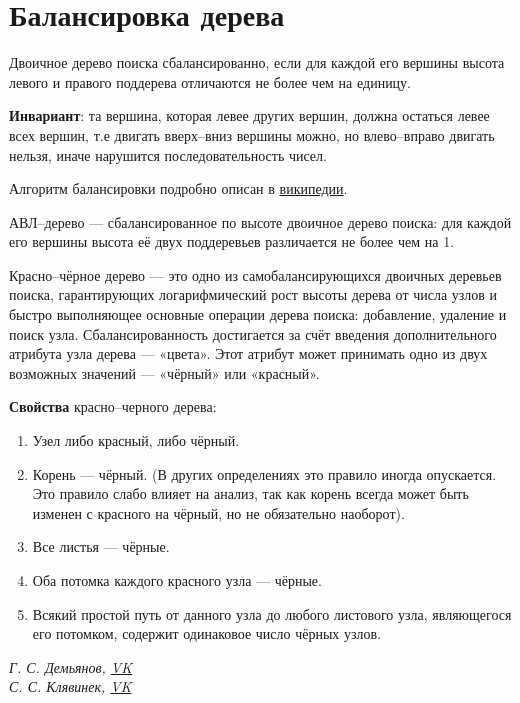 \documentclass[a4paper,12pt]{article}
\theoremstyle{plain} %
\theoremstyle{definition} %
\theoremstyle{remark} %
\newcounter{num}
\begin{document}
\section{Балансировка дерева}
Двоичное дерево поиска \textsf{сбалансированно}, если для каждой его вершины высота левого и правого поддерева отличаются не более чем на единицу.
	
\textbf{Инвариант}: та вершина, которая левее других вершин, должна остаться левее всех вершин, т.е двигать вверх--вниз вершины можно, но влево--вправо двигать нельзя, иначе нарушится последовательность чисел.

Алгоритм балансировки подробно описан в \href{https://ru.wikipedia.org/wiki/%D0%90%D0%92%D0%9B-%D0%B4%D0%B5%D1%80%D0%B5%D0%B2%D0%BE#.D0.91.D0.B0.D0.BB.D0.B0.D0.BD.D1.81.D0.B8.D1.80.D0.BE.D0.B2.D0.BA.D0.B0}{википедии}.

\textsf{АВЛ--дерево} --- сбалансированное по высоте двоичное дерево поиска: для каждой его вершины высота её двух поддеревьев различается не более чем на 1.


\textsf{Красно--чёрное дерево} --- это одно из самобалансирующихся двоичных деревьев поиска, гарантирующих логарифмический рост высоты дерева от числа узлов и быстро выполняющее основные операции дерева поиска: добавление, удаление и поиск узла. Сбалансированность достигается за счёт введения дополнительного атрибута узла дерева --- «цвета». Этот атрибут может принимать одно из двух возможных значений --- «чёрный» или «красный».

\textbf{Свойства} красно--черного дерева:
\begin{enumerate}
	\item Узел либо красный, либо чёрный.
	\item Корень --- чёрный. (В других определениях это правило иногда опускается. Это правило слабо влияет на анализ, так как корень всегда может быть изменен с красного на чёрный, но не обязательно наоборот).
	\item Все листья --- чёрные.
	\item Оба потомка каждого красного узла --- чёрные.
	\item Всякий простой путь от данного узла до любого листового узла, являющегося его потомком, содержит одинаковое число чёрных узлов.
\end{enumerate}








\begin{center}
	\vfill \emph{{\small Г. С. Демьянов, \href{https://vk.com/id37346992}{VK}\\
С. С. Клявинек, \href{https://vk.com/id85132547}{VK}
}}
\end{center}
\end{document}
